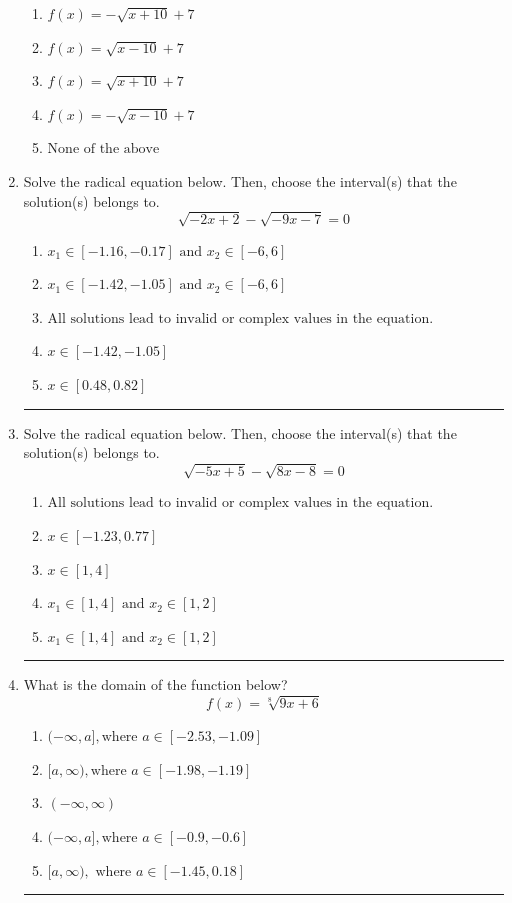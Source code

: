 \documentclass[14pt]{extbook}
\newcommand{\litem}[1]{\item#1\hspace*{-1cm}\rule{\textwidth}{0.4pt}}
\begin{document}
\begin{enumerate}
{\begin{center}
\end{center}
\begin{enumerate}[label=\Alph*.]
\item \( f(x) = - \sqrt{x + 10} + 7 \)
\item \( f(x) = \sqrt{x - 10} + 7 \)
\item \( f(x) = \sqrt{x + 10} + 7 \)
\item \( f(x) = - \sqrt{x - 10} + 7 \)
\item \( \text{None of the above} \)

\end{enumerate} }
\litem{
Solve the radical equation below. Then, choose the interval(s) that the solution(s) belongs to.\[ \sqrt{-2 x + 2} - \sqrt{-9 x - 7} = 0 \]\begin{enumerate}[label=\Alph*.]
\item \( x_1 \in [-1.16, -0.17] \text{ and } x_2 \in [-6,6] \)
\item \( x_1 \in [-1.42, -1.05] \text{ and } x_2 \in [-6,6] \)
\item \( \text{All solutions lead to invalid or complex values in the equation.} \)
\item \( x \in [-1.42,-1.05] \)
\item \( x \in [0.48,0.82] \)

\end{enumerate} }
\litem{
Solve the radical equation below. Then, choose the interval(s) that the solution(s) belongs to.\[ \sqrt{-5 x + 5} - \sqrt{8 x - 8} = 0 \]\begin{enumerate}[label=\Alph*.]
\item \( \text{All solutions lead to invalid or complex values in the equation.} \)
\item \( x \in [-1.23,0.77] \)
\item \( x \in [1,4] \)
\item \( x_1 \in [1, 4] \text{ and } x_2 \in [1,2] \)
\item \( x_1 \in [1, 4] \text{ and } x_2 \in [1,2] \)

\end{enumerate} }
\litem{
What is the domain of the function below?\[ f(x) = \sqrt[8]{9 x + 6} \]\begin{enumerate}[label=\Alph*.]
\item \( (-\infty, a], \text{where } a \in [-2.53, -1.09] \)
\item \( [a, \infty), \text{where } a \in [-1.98, -1.19] \)
\item \( (-\infty, \infty) \)
\item \( (-\infty, a], \text{where } a \in [-0.9, -0.6] \)
\item \( [a, \infty), \text{ where } a \in [-1.45, 0.18] \)


\end{enumerate}}
\end{enumerate}
\end{document}
